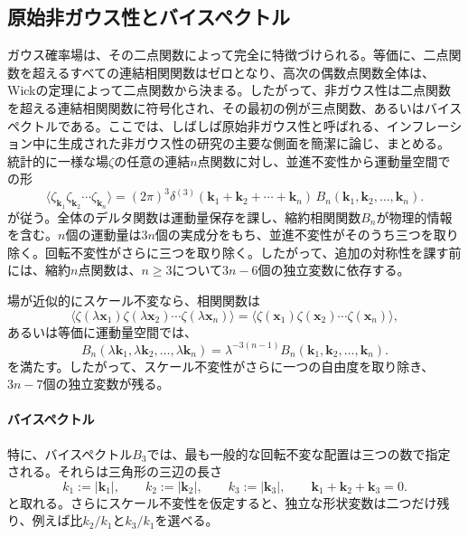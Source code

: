 \documentclass[a4paper,11pt,oneside]{article}
\theoremstyle{definition}
\numberwithin{equation}{section}
\begin{document}
\subsection{原始非ガウス性とバイスペクトル}



ガウス確率場は、その二点関数によって完全に特徴づけられる。等価に、二点関数を超えるすべての連結相関関数はゼロとなり、高次の偶数点関数全体は、Wickの定理によって二点関数から決まる。したがって、非ガウス性は二点関数を超える連結相関関数に符号化され、その最初の例が三点関数、あるいはバイスペクトルである。ここでは、しばしば原始非ガウス性と呼ばれる、インフレーション中に生成された非ガウス性の研究の主要な側面を簡潔に論じ、まとめる。\\



統計的に一様な場\(\zeta\)の任意の連結\(n\)点関数に対し、並進不変性から運動量空間での形
\begin{equation}
\langle \zeta_{\mathbf k_1}\zeta_{\mathbf k_2}\cdots \zeta_{\mathbf k_n}\rangle
=
(2\pi)^3\delta^{(3)}\!\left(\mathbf k_1+\mathbf k_2+\cdots+\mathbf k_n\right)\,
B_n(\mathbf k_1,\mathbf k_2,\dots,\mathbf k_n) .
\end{equation}
が従う。全体のデルタ関数は運動量保存を課し、縮約相関関数\(B_n\)が物理的情報を含む。\(n\)個の運動量は\(3n\)個の実成分をもち、並進不変性がそのうち三つを取り除く。回転不変性がさらに三つを取り除く。したがって、追加の対称性を課す前には、縮約\(n\)点関数は、$ n\geq 3$について$ 3n-6  $個の独立変数に依存する。



場が近似的にスケール不変なら、相関関数は
\begin{equation}
\langle \zeta(\lambda \mathbf x_1)\zeta(\lambda \mathbf x_2)\cdots \zeta(\lambda \mathbf x_n)\rangle
=
\langle \zeta(\mathbf x_1)\zeta(\mathbf x_2)\cdots \zeta(\mathbf x_n)\rangle ,
\end{equation}
あるいは等価に運動量空間では、
\begin{equation}
B_n(\lambda \mathbf k_1,\lambda \mathbf k_2,\dots,\lambda \mathbf k_n)
=
\lambda^{-3(n-1)}B_n(\mathbf k_1,\mathbf k_2,\dots,\mathbf k_n) .
\end{equation}
を満たす。したがって、スケール不変性がさらに一つの自由度を取り除き、$ 3n-7  $個の独立変数が残る。



\paragraph{バイスペクトル} 特に、バイスペクトル\(B_3\)では、最も一般的な回転不変な配置は三つの数で指定される。それらは三角形の三辺の長さ
\begin{equation}
k_1:=|\mathbf k_1|,
\qquad
k_2:=|\mathbf k_2|,
\qquad
k_3:=|\mathbf k_3|,
\qquad
\mathbf k_1+\mathbf k_2+\mathbf k_3=0 .
\end{equation}
と取れる。さらにスケール不変性を仮定すると、独立な形状変数は二つだけ残り、例えば比\(k_2/k_1\)と\(k_3/k_1\)\cite{Babich:2004gb}を選べる。
\end{document}
